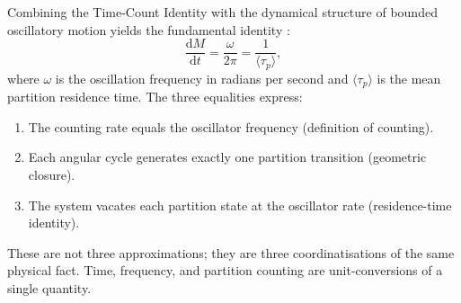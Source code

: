 \documentclass[twocolumn,10pt,a4paper]{article}
\theoremstyle{definition}
\theoremstyle{remark}
\newcommand{\tp}{\langle\tau_p\rangle}
\newcommand{\dM}{\mathrm{d}M}
\newcommand{\dt}{\mathrm{d}t}
\begin{document}
Combining the Time-Count Identity with the dynamical structure of bounded oscillatory motion yields the fundamental identity \citep{sachikonye2025counting}:
\begin{equation}
    \frac{\dM}{\dt} = \frac{\omega}{2\pi} = \frac{1}{\tp},
    \label{eq:fundamental}
\end{equation}
where $\omega$ is the oscillation frequency in radians per second and $\tp$ is the mean partition residence time. The three equalities express:
\begin{enumerate}[leftmargin=1.2em,itemsep=0.2em]
    \item The counting rate equals the oscillator frequency (definition of counting).
    \item Each angular cycle generates exactly one partition transition (geometric closure).
    \item The system vacates each partition state at the oscillator rate (residence-time identity).
\end{enumerate}

These are not three approximations; they are three coordinatisations of the same physical fact. Time, frequency, and partition counting are unit-conversions of a single quantity.
\end{document}
